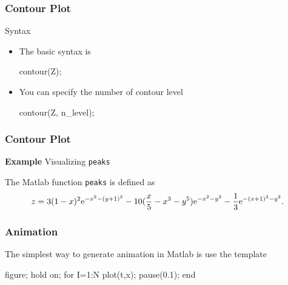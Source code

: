 \documentclass[compress]{beamer}  %
\begin{document}
\begin{frame}[fragile]
\frametitle{Contour Plot}

\begin{block}{Syntax}
\begin{itemize}[<+->]
    \item The basic syntax is
          \begin{matlabcodebeamer}[numbers=none,frame=none]
          contour(Z);
          \end{matlabcodebeamer}
    \item You can specify the number of contour level
          \begin{matlabcodebeamer}[numbers=none,frame=none]
          contour(Z, n_level);
          \end{matlabcodebeamer}
\end{itemize}
\end{block}
\end{frame}
\begin{frame}[fragile]
\frametitle{Contour Plot}
\textbf{Example} Visualizing \texttt{peaks}

The Matlab function \texttt{peaks} is defined as
\begin{equation}
    z = 3(1-x)^2 \textrm{e}^{-x^2 - (y+1)^2} - 10(\frac{x}{5}-x^3-y^5)\textrm{e}^{-x^2-y^2}-
    \frac{1}{3}\textrm{e}^{-(x+1)^2-y^2}.
\end{equation}\pause

\setcounter{subfigure}{0}
\begin{figure}
    \centering
\end{figure}

\end{frame}
\begin{frame}[fragile]
\frametitle{Animation}
The simplest way to generate animation in Matlab is use the template
\begin{matlabcode}[numbers=none,frame=none]
          figure;
          hold on;    
          for I=1:N
              plot(t,x);  %
              pause(0.1); %
          end
\end{matlabcode}

\end{frame}
\end{document}
